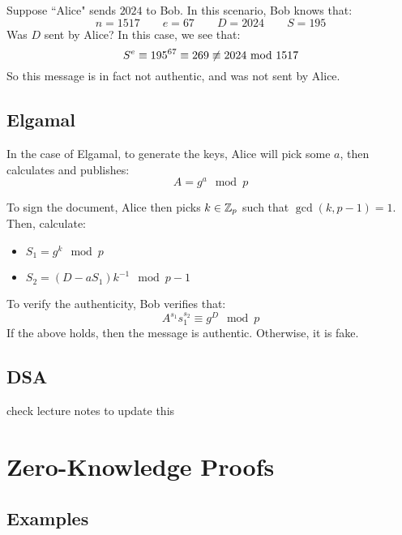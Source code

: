 \documentclass{article}
\begin{document}
\begin{xmp}[source=Primary Source Material]
    Suppose ``Alice" sends $ 2024 $ to Bob. In this scenario, Bob knows that:
    \begin{equation*}
        n = 1517 \qquad e = 67 \qquad D = 2024 \qquad S = 195
    \end{equation*}
    Was $ D $ sent by Alice? \vsp
    In this case, we see that:
    \begin{equation*}
        S^{e} \equiv 195^{67} \equiv 269 \cnot\equiv 2024 \mod 1517
    \end{equation*}
    So this message is in fact not authentic, and was not sent by Alice.
\end{xmp}

\subsection{Elgamal}

In the case of Elgamal, to generate the keys,
Alice will pick some $ a $, then calculates and publishes:
\begin{equation*}
    A = g^{a} \mod p
\end{equation*}

To sign the document, Alice then picks $ k \in \mathbb{Z}_{p} $ such that $ \gcd(k, p-1) = 1 $.
Then, calculate:
\begin{itemize}
    \item $ S_{1} = g^{k} \mod p $
    \item $ S_{2} = (D - aS_{1})k^{-1} \mod p-1 $
\end{itemize}

To verify the authenticity, Bob verifies that:
\begin{equation*}
    A^{s_{1}}s_{1}^{s_{2}} \equiv g^{D} \mod p
\end{equation*}
If the above holds, then the message is authentic. Otherwise, it is fake.


\subsection{DSA}
check lecture notes to update this

\newpage
\section{Zero-Knowledge Proofs}
\subsection{Examples}
\end{document}
